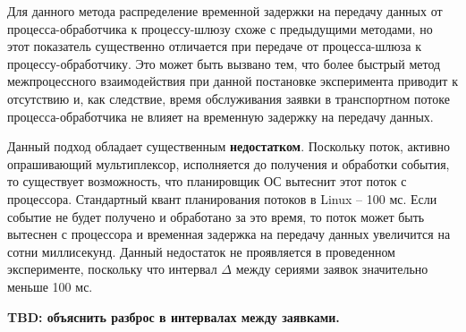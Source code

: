 Для данного метода распределение временной задержки на передачу данных от процесса-обработчика к процессу-шлюзу схоже с предыдущими методами, но этот показатель существенно отличается при передаче от процесса-шлюза к процессу-обработчику. Это может быть вызвано тем, что более быстрый метод межпроцессного взаимодействия при данной постановке эксперимента приводит к отсутствию и, как следствие, время обслуживания заявки в транспортном потоке процесса-обработчика не влияет на временную задержку на передачу данных.

Данный подход обладает существенным \textbf{недостатком}. Поскольку поток, активно опрашивающий мультиплексор, исполняется до получения и обработки события, то существует возможность, что планировщик ОС вытеснит этот поток с процессора. Стандартный квант планирования потоков в Linux -- 100 мс. Если событие не будет получено и обработано за это время, то поток может быть вытеснен с процессора и временная задержка на передачу данных увеличится на сотни миллисекунд. Данный недостаток не проявляется в проведенном эксперименте, поскольку что интервал $\Delta$ между сериями заявок значительно меньше 100 мс.

\textbf{TBD: объяснить разброс в интервалах между заявками.}
